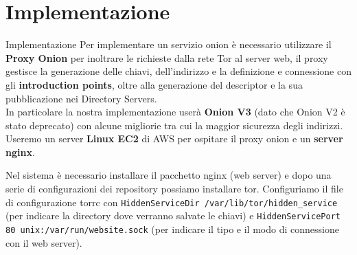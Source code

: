 \section{Implementazione}
\begin{frame}{Implementazione}
    Per implementare un servizio onion è necessario utilizzare il \textbf{Proxy Onion} per inoltrare le richieste dalla rete Tor al server web, il proxy gestisce la generazione delle chiavi, dell'indirizzo e la definizione e connessione con gli \textbf{introduction points}, oltre alla generazione del descriptor e la sua pubblicazione nei Directory Servers. \\
    In particolare la nostra implementazione userà \textbf{Onion V3} (dato che Onion V2 è stato deprecato) con alcune migliorie tra cui la maggior sicurezza degli indirizzi. \\
    Useremo un server \textbf{Linux EC2} di AWS per ospitare il proxy onion e un \textbf{server nginx}.
\end{frame}

\begin{frame}
    Nel sistema è necessario installare il pacchetto nginx (web server) e dopo una serie di configurazioni dei repository possiamo installare tor. 
    \newline
    Configuriamo il file di configurazione torrc con \lstinline{HiddenServiceDir /var/lib/tor/hidden_service} (per indicare la directory dove verranno salvate le chiavi) e \lstinline{HiddenServicePort 80 unix:/var/run/website.sock} (per indicare il tipo e il modo di connessione con il web server).
\end{frame}